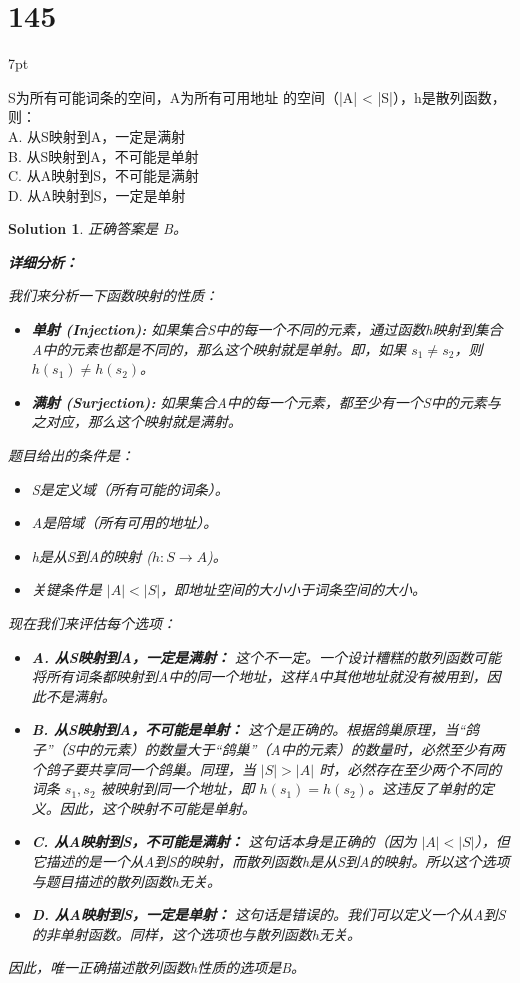\documentclass[UTF8]{report}
\newtheorem{solution}{Solution}
\theoremstyle{MyLineTheoremStyle} %
\theoremstyle{MyBlockTheoremStyle} %
\theoremstyle{MySubsubsectionStyle} %
\newenvironment{graybox}{%
        \def\FrameCommand{%
        \hspace{1pt}%
        {\color{gray}\small \vrule width 2pt}%
        {\color{graybox_color}\vrule width 4pt}%
        \colorbox{graybox_color}%
        }%
        \MakeFramed{\advance\hsize-\width\FrameRestore}%
        \noindent\hspace{-4.55pt}%
        \begin{adjustwidth}{}{7pt}%
        \vspace{2pt}\vspace{2pt}%
        }
        {%
        \vspace{2pt}\end{adjustwidth}\endMakeFramed%
        }
\begin{document}
\section*{145}
\begin{graybox}
S为所有可能词条的空间，A为所有可用地址
的空间（|A| < |S|），h是散列函数，则：\\
A. 从S映射到A，一定是满射\\
B. 从S映射到A，不可能是单射\\
C. 从A映射到S，不可能是满射\\
D. 从A映射到S，一定是单射
\end{graybox}

\begin{solution}
正确答案是 B。

\textbf{详细分析：}

我们来分析一下函数映射的性质：
\begin{itemize}
    \item \textbf{单射 (Injection):} 如果集合S中的每一个不同的元素，通过函数h映射到集合A中的元素也都是不同的，那么这个映射就是单射。即，如果 $s_1 \neq s_2$，则 $h(s_1) \neq h(s_2)$。
    \item \textbf{满射 (Surjection):} 如果集合A中的每一个元素，都至少有一个S中的元素与之对应，那么这个映射就是满射。
\end{itemize}

题目给出的条件是：
\begin{itemize}
    \item S是定义域（所有可能的词条）。
    \item A是陪域（所有可用的地址）。
    \item h是从S到A的映射 ($h: S \to A$)。
    \item 关键条件是 $|A| < |S|$，即地址空间的大小小于词条空间的大小。
\end{itemize}

现在我们来评估每个选项：
\begin{itemize}
    \item \textbf{A. 从S映射到A，一定是满射：} 这个不一定。一个设计糟糕的散列函数可能将所有词条都映射到A中的同一个地址，这样A中其他地址就没有被用到，因此不是满射。
    \item \textbf{B. 从S映射到A，不可能是单射：} 这个是正确的。根据鸽巢原理，当“鸽子”（S中的元素）的数量大于“鸽巢”（A中的元素）的数量时，必然至少有两个鸽子要共享同一个鸽巢。同理，当 $|S| > |A|$ 时，必然存在至少两个不同的词条 $s_1, s_2$ 被映射到同一个地址，即 $h(s_1) = h(s_2)$。这违反了单射的定义。因此，这个映射不可能是单射。
    \item \textbf{C. 从A映射到S，不可能是满射：} 这句话本身是正确的（因为 $|A| < |S|$），但它描述的是一个从A到S的映射，而散列函数h是从S到A的映射。所以这个选项与题目描述的散列函数h无关。
    \item \textbf{D. 从A映射到S，一定是单射：} 这句话是错误的。我们可以定义一个从A到S的非单射函数。同样，这个选项也与散列函数h无关。
\end{itemize}

因此，唯一正确描述散列函数h性质的选项是B。
\end{solution}
\end{document}
